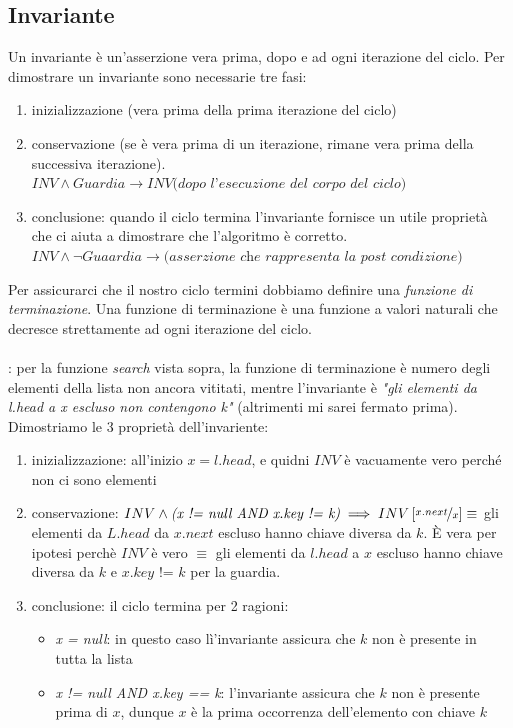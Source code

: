 \documentclass[italian]{article}
\newcommand{\example}{\text{\faCircleArrowRight $\;$ Esempio }}
\begin{document}
\subsection{Invariante}
Un invariante è un’asserzione vera prima, dopo e ad ogni iterazione del ciclo. Per dimostrare un invariante sono necessarie tre fasi:
\begin{enumerate}[itemsep=0pt]
	\item inizializzazione (vera prima della prima iterazione del ciclo)
	\item conservazione (se è vera prima di un iterazione, rimane vera prima della successiva iterazione). $INV \land Guardia \to INV \textit{(dopo l’esecuzione del corpo del ciclo)}$	
	\item conclusione: quando il ciclo termina l’invariante fornisce un utile proprietà che ci aiuta a dimostrare che l’algoritmo è corretto.
	$INV \land \lnot Guaardia \to \textit{(asserzione che rappresenta la post condizione)}$	
\end{enumerate}
Per assicurarci che il nostro ciclo termini dobbiamo definire una \textit{funzione di terminazione}. Una funzione di terminazione è una funzione a valori naturali che decresce strettamente ad ogni iterazione del ciclo. \\\\
\textbf{\example}: per la funzione \textit{search} vista sopra, la funzione di terminazione è numero degli elementi della lista non ancora vititati, mentre l'invariante è \textit{"gli elementi da l.head a x escluso non contengono k"} (altrimenti mi sarei fermato prima). Dimostriamo le 3 proprietà dell'invariente:
\begin{enumerate}[itemsep=0pt]
	\item inizializzazione: all'inizio $x = l.head$, e quidni $INV$ è vacuamente vero perché non ci sono elementi
	\item conservazione: $INV \land \textit{(x != null AND x.key != k)} \implies INV\left[\nicefrac{x.next}{x}\right] \equiv $ gli elementi da $L.head$ da $x.next$ escluso hanno chiave diversa da $k$. È vera per ipotesi perchè $INV$ è vero $\equiv$ gli elementi da $l.head$ a $x$ escluso hanno chiave diversa da $k$ e $\textit{x.key != k}$ per la guardia.
	\item conclusione: il ciclo termina per 2 ragioni:
		\begin{itemize}[itemsep=0pt]
			\item \textit{x = null}: in questo caso lì'invariante assicura che $k$ non è presente in tutta la lista
			\item \textit{x != null AND x.key == k}: l’invariante assicura che $k$ non è presente prima di $x$, dunque $x$ è la prima occorrenza dell’elemento con chiave $k$
		\end{itemize}
\end{enumerate}
\pagebreak
\end{document}
